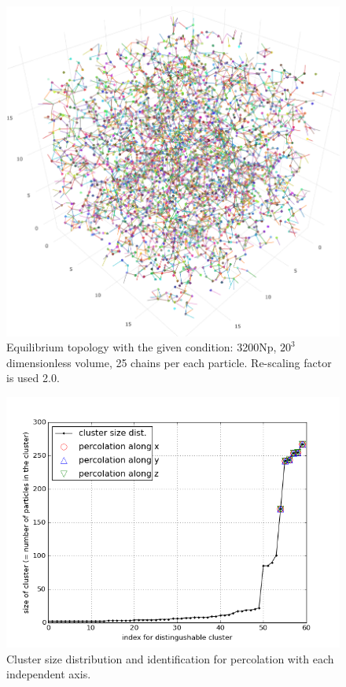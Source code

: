 \documentclass[11pt]{article}
\begin{document}
\begin{figure}[htb]
\centering
\includegraphics[width=.9\linewidth]{data_structure/ex_3d_NP3200_SF20_percolation.png}
\caption{\label{fig:orgparagraph2}
Equilibrium topology with the given condition: 3200Np, \(20^3\) dimensionless volume, 25 chains per each particle. Re-scaling factor is used 2.0.}
\end{figure}

\begin{figure}[htb]
\centering
\includegraphics[width=.9\linewidth]{data_structure/percolation_test_3D.png}
\caption{\label{fig:orgparagraph3}
Cluster size distribution and identification for percolation with each independent axis.}
\end{figure}
\end{document}

